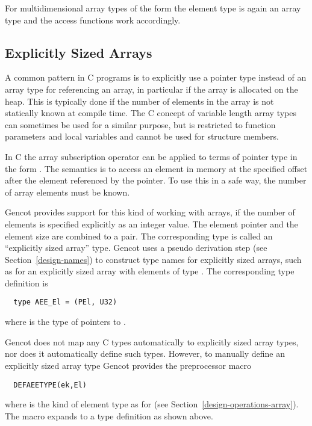 For multidimensional array types of the form  the element type is again an array type and the access 
functions work accordingly.

\subsection{Explicitly Sized Arrays}
\label{design-operations-eearray}

A common pattern in C programs is to explicitly use a pointer type instead of an array type for referencing an array,
in particular if the array is allocated on the heap. This is typically done if the number of elements in the
array is not statically known at compile time. The C concept of variable length array types can sometimes be
used for a similar purpose, but is restricted to function parameters and local variables and cannot be used for
structure members.

In C the array subscription operator can be applied to terms of pointer type  in the form . 
The semantics is to access an element in memory at the specified offset after the element referenced by the pointer. 
To use this in a safe way, the number of array elements must be known. 

Gencot provides support for this kind of working with arrays, if the number of elements is specified explicitly as
an integer value. The element pointer and the element size are combined to a pair. The corresponding type is called
an ``explicitly sized array'' type. Gencot uses a pseudo derivation step (see Section~\ref{design-names})  
to construct type names for explicitly sized arrays, such as  for an explicitly sized array with elements
of type . The corresponding type definition is
\begin{verbatim}
  type AEE_El = (PEl, U32)
\end{verbatim}
where  is the type of pointers to .

Gencot does not map any C types automatically to explicitly sized array types, nor does it automatically define such
types. However, to manually define an explicitly sized array type Gencot provides the preprocessor macro
\begin{verbatim}
  DEFAEETYPE(ek,El)
\end{verbatim}
where  is the kind of element type as for  (see Section~\ref{design-operations-array}). The 
macro expands to a type definition as shown above.

